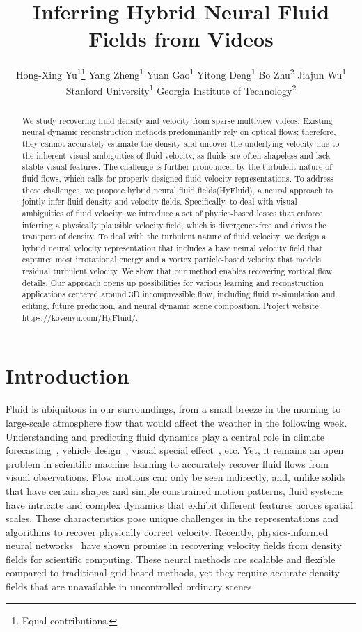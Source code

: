 \documentclass{article}
\title{Inferring Hybrid Neural Fluid Fields from Videos}
\author{
Hong-Xing Yu\textsuperscript{1}\thanks{Equal contributions.}
\And
Yang Zheng\textsuperscript{1}\footnotemark[1]
\And
Yuan Gao\textsuperscript{1}
\And
Yitong Deng\textsuperscript{1}
\And
Bo Zhu\textsuperscript{2}
\And
Jiajun Wu\textsuperscript{1}
\AND
\textnormal{Stanford University\textsuperscript{1}}
\And
\textnormal{Georgia Institute of Technology\textsuperscript{2}}
}
\newcommand{\modelfull}{hybrid neural fluid fields\xspace}
\newcommand{\model}{HyFluid\xspace}
\begin{document}
\maketitle


\begin{abstract}
    We study recovering fluid density and velocity from sparse multiview videos. Existing neural dynamic reconstruction methods predominantly rely on optical flows; therefore, they cannot accurately estimate the density and uncover the underlying velocity due to the inherent visual ambiguities of fluid velocity, as fluids are often shapeless and lack stable visual features. The challenge is further pronounced by the turbulent nature of fluid flows, which calls for properly designed fluid velocity representations. To address these challenges, we propose \modelfull (\model), a neural approach to jointly infer fluid density and velocity fields. Specifically, to deal with visual ambiguities of fluid velocity, we introduce a set of physics-based losses that enforce inferring a physically plausible velocity field, which is divergence-free and drives the transport of density. To deal with the turbulent nature of fluid velocity, we design a hybrid neural velocity representation that includes a base neural velocity field that captures most irrotational energy and a vortex particle-based velocity that models residual turbulent velocity. We show that our method enables recovering vortical flow details. Our approach opens up possibilities for various learning and reconstruction applications centered around 3D incompressible flow, including fluid re-simulation and editing, future prediction, and neural dynamic scene composition. Project website: \url{https://kovenyu.com/HyFluid/}.
\end{abstract} \section{Introduction}

Fluid is ubiquitous in our surroundings, from a small breeze in the morning to large-scale atmosphere flow that would affect the weather in the following week. Understanding and predicting fluid dynamics play a central role in climate forecasting~\citep{bauer2015quiet}, vehicle design~\citep{bushnell1991drag}, visual special effect~\citep{pfaff2010scalable}, etc. Yet, it remains an open problem in scientific machine learning to accurately recover fluid flows from visual observations. Flow motions can only be seen indirectly, and, unlike solids that have certain shapes and simple constrained motion patterns, fluid systems have intricate and complex dynamics that exhibit different features across spatial scales. These characteristics pose unique challenges in the representations and algorithms to recover physically correct velocity. Recently, physics-informed neural networks~\citep{raissi2019physics} have shown promise in recovering velocity fields from density fields for scientific computing. These neural methods are scalable and flexible compared to traditional grid-based methods, yet they require accurate density fields that are unavailable in uncontrolled ordinary scenes.
\end{document}
